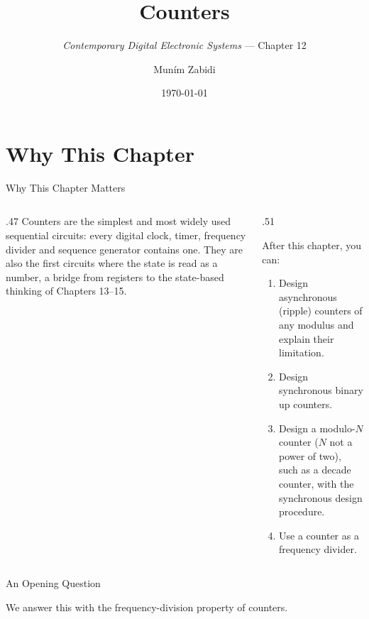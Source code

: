 \documentclass[9pt,aspectratio=169,xcolor=table]{beamer}
\title{Counters}
\subtitle{\emph{Contemporary Digital Electronic Systems} --- Chapter 12}
\author{Mun\'{i}m Zabidi}
\institute{\color{primary}Faculty of Electrical Engineering, Universiti Teknologi Malaysia}
\date{\today}
\begin{document}
\titlepage

\section{Why This Chapter}

\begin{frame}{Why This Chapter Matters}
  \begin{columns}[c]
  \begin{column}{.47\textwidth}
    Counters are the simplest and most widely used sequential circuits: every digital clock, timer, frequency divider and sequence generator contains one. They are also the first circuits where the \alert{state is read as a number}, a bridge from registers to the state-based thinking of Chapters 13--15.
  \end{column}
  \begin{column}{.51\textwidth}
    \begin{block}{After this chapter, you can:}
    {\small
    \begin{enumerate}\itemsep2pt
      \item Design asynchronous (ripple) counters of any modulus and explain their limitation.
      \item Design synchronous binary up counters.
      \item Design a modulo-$N$ counter ($N$ not a power of two), such as a decade counter, with the synchronous design procedure.
      \item Use a counter as a frequency divider.
    \end{enumerate}}
    \end{block}
  \end{column}
  \end{columns}
\end{frame}

\begin{frame}{An Opening Question}
  \leavevmode\vspace{4mm}
  \begin{center}
  \end{center}
  \vspace{4mm}
  We answer this with the frequency-division property of counters.
\end{frame}
\end{document}
